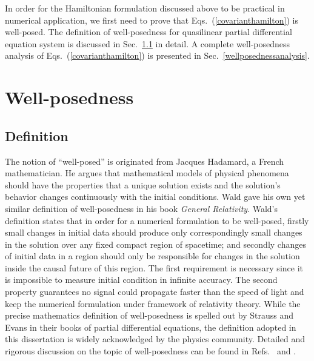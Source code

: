 In order for the Hamiltonian formulation discussed above to be practical in numerical application, we first need to prove that Eqs.~(\ref{covarianthamilton}) is well-posed. The definition of well-posedness for quasilinear partial differential equation system is discussed in Sec.~\ref{wellposednessdefinition} in detail. A complete well-posedness analysis of Eqs.~(\ref{covarianthamilton}) is presented in Sec.~\ref{wellposednessanalysis}.
\section{Well-posedness}\label{wellposedness}
\subsection{Definition}\label{wellposednessdefinition}
The notion of ``well-posed'' is originated from Jacques Hadamard\cite[pp. 49--52]{hadamard}, a French mathematician. He argues that mathematical models of physical phenomena should have the properties that a unique solution exists and the solution's behavior changes continuously with the initial conditions. Wald gave his own yet similar definition of well-posedness in his book {\em General Relativity}\cite[pp. 244]{Wald:GRbook}. Wald's definition states that in order for a numerical formulation to be well-posed, firstly small changes in initial data should produce only correspondingly small changes in the solution over any fixed compact region of spacetime; and secondly changes of initial data in a region should only be responsible for changes in the solution inside the causal future of this region. The first requirement is necessary since it is impossible to measure initial condition in infinite accuracy. The second property guarantees no signal could propagate faster than the speed of light and keep the numerical formulation under framework of relativity theory. While the precise mathematics definition of well-posedness is spelled out by Strauss\cite[pp. 25]{strauss1992partial} and Evans\cite[pp. 7]{evans2010partial} in their books of partial differential equations, the definition adopted in this dissertation is widely acknowledged by the physics community. Detailed and rigorous discussion on the topic of well-posedness can be found in Refs.~\cite{PhysRevD.66.041501, 0264-9381-23-16-S06, Gustafsson-Well-posed, 0264-9381-23-16-S07, PhysRevD.70.044012, lrr-1998-3, Reula:2004xd, 0264-9381-15-9-029, lrr-2012-9} and \cite[pp. 18--19]{Kreiss:navier-stokes}.

